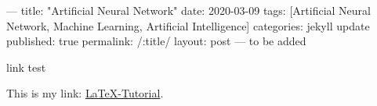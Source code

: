 ---
title: "Artificial Neural Network"
date: 2020-03-09
tags: [Artificial Neural Network, Machine Learning, Artificial Intelligence]
categories: jekyll update
published: true
permalink: /:title/
layout: post
---
to be added

link test


This is my link: \href{http://www.latex-tutorial.com}{LaTeX-Tutorial}.


